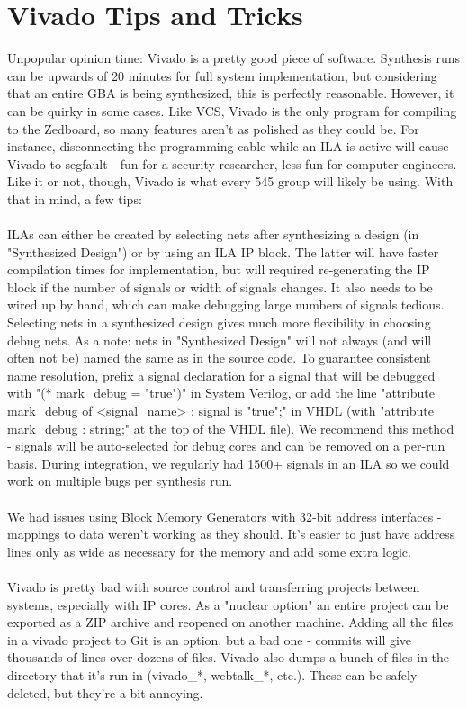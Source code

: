 \documentclass[11pt,a4paper]{article}
\begin{document}
	\section{Vivado Tips and Tricks}
	Unpopular opinion time: Vivado is a pretty good piece of software. Synthesis runs can be upwards of 20 minutes for full system implementation, but considering that an entire GBA is being synthesized, this is perfectly reasonable. However, it can be quirky in some cases. Like VCS, Vivado is the only program for compiling to the Zedboard, so many features aren't as polished as they could be. For instance, disconnecting the programming cable while an ILA is active will cause Vivado to segfault - fun for a security researcher, less fun for computer engineers. Like it or not, though, Vivado is what every 545 group will likely be using. With that in mind, a few tips:\\\\
	ILAs can either be created by selecting nets after synthesizing a design (in "Synthesized Design") or by using an ILA IP block. The latter will have faster compilation times for implementation, but will required re-generating the IP block if the number of signals or width of signals changes. It also needs to be wired up by hand, which can make debugging large numbers of signals tedious. Selecting nets in a synthesized design gives much more flexibility in choosing debug nets. As a note: nets in "Synthesized Design" will not always (and will often not be) named the same as in the source code. To guarantee consistent name resolution, prefix a signal declaration for a signal that will be debugged with "(* mark\_debug = "true")" in System Verilog, or add the line "attribute mark\_debug of <signal\_name> : signal is "true";" in VHDL (with "attribute mark\_debug : string;" at the top of the VHDL file). We recommend this method - signals will be auto-selected for debug cores and can be removed on a per-run basis. During integration, we regularly had 1500+ signals in an ILA so we could work on multiple bugs per synthesis run.\\\\
	We had issues using Block Memory Generators with 32-bit address interfaces - mappings to data weren't working as they should. It's easier to just have address lines only as wide as necessary for the memory and add some extra logic.\\\\
	Vivado is pretty bad with source control and transferring projects between systems, especially with IP cores. As a "nuclear option" an entire project can be exported as a ZIP archive and reopened on another machine. Adding all the files in a vivado project to Git is an option, but a bad one - commits will give thousands of lines over dozens of files. Vivado also dumps a bunch of files in the directory that it's run in (vivado\_*, webtalk\_*, etc.). These can be safely deleted, but they're a bit annoying.\\\\
\end{document}

